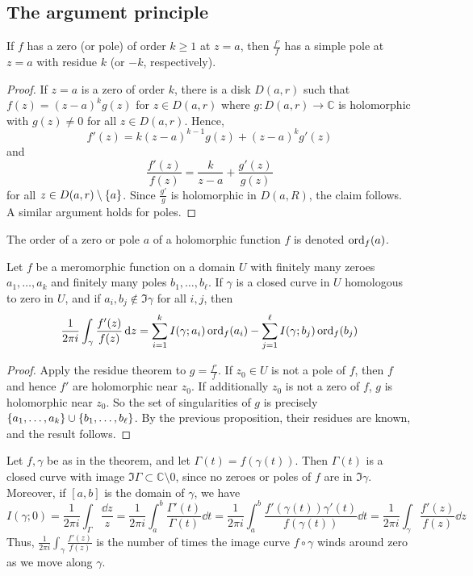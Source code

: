 \subsection{The argument principle}
\begin{proposition}
	If \( f \) has a zero (or pole) of order \( k \geq 1 \) at \( z = a \), then \( \frac{f'}{f} \) has a simple pole at \( z = a \) with residue \( k \) (or \( -k \), respectively).
\end{proposition}
\begin{proof}
	If \( z = a \) is a zero of order \( k \), there is a disk \( D(a,r) \) such that \( f(z) = (z-a)^k g(z) \) for \( z \in D(a,r) \) where \( g \colon D(a,r) \to \mathbb C \) is holomorphic with \( g(z) \neq 0 \) for all \( z \in D(a,r) \).
	Hence,
	\[
		f'(z) = k(z-a)^{k-1} g(z) + (z-a)^k g'(z)
	\]
	and
	\[
		\frac{f'(z)}{f(z)} = \frac{k}{z-a} + \frac{g'(z)}{g(z)}
	\]
	for all \( z \in D(a,r) \setminus \qty{a} \).
	Since \( \frac{g'}{g} \) is holomorphic in \( D(a,R) \), the claim follows.
	A similar argument holds for poles.
\end{proof}
\begin{definition}
	The order of a zero or pole \( a \) of a holomorphic function \( f \) is denoted \( \operatorname{ord}_f(a) \).
\end{definition}
\begin{theorem}
	Let \( f \) be a meromorphic function on a domain \( U \) with finitely many zeroes \( a_1, \dots, a_k \) and finitely many poles \( b_1, \dots, b_\ell \).
	If \( \gamma \) is a closed curve in \( U \) homologous to zero in \( U \), and if \( a_i, b_j \not\in \Im \gamma \) for all \( i,j \), then
	\[
		\frac{1}{2\pi i} \int_\gamma \frac{f'(z)}{f(z)} \dd{z} = \sum_{i=1}^k I(\gamma;a_i) \operatorname{ord}_f(a_i) - \sum_{j=1}^\ell I(\gamma;b_j) \operatorname{ord}_f(b_j)
	\]
\end{theorem}
\begin{proof}
	Apply the residue theorem to \( g = \frac{f'}{f} \).
	If \( z_0 \in U \) is not a pole of \( f \), then \( f \) and hence \( f' \) are holomorphic near \( z_0 \).
	If additionally \( z_0 \) is not a zero of \( f \), \( g \) is holomorphic near \( z_0 \).
	So the set of singularities of \( g \) is precisely \( \qty{a_1, \dots, a_k} \cup \qty{b_1, \dots, b_\ell} \).
	By the previous proposition, their residues are known, and the result follows.
\end{proof}
\begin{remark}
	Let \( f, \gamma \) be as in the theorem, and let \( \Gamma(t) = f(\gamma(t)) \).
	Then \( \Gamma(t) \) is a closed curve with image \( \Im \Gamma \subset \mathbb C \setminus \qty{0} \), since no zeroes or poles of \( f \) are in \( \Im \gamma \).
	Moreover, if \( [a,b] \) is the domain of \( \gamma \), we have
	\[
		I(\gamma;0) = \frac{1}{2\pi i} \int_\Gamma \frac{\dd{z}}{z} = \frac{1}{2\pi i} \int_a^b \frac{\Gamma'(t)}{\Gamma(t)} \dd{t} = \frac{1}{2\pi i} \int_a^b \frac{f'(\gamma(t)) \gamma'(t)}{f(\gamma(t))} \dd{t} = \frac{1}{2 \pi i} \int_\gamma \frac{f'(z)}{f(z)} \dd{z}
	\]
	Thus, \( \frac{1}{2 \pi i} \int_\gamma \frac{f'(z)}{f(z)} \) is the number of times the image curve \( f \circ \gamma \) winds around zero as we move along \( \gamma \).
\end{remark}
